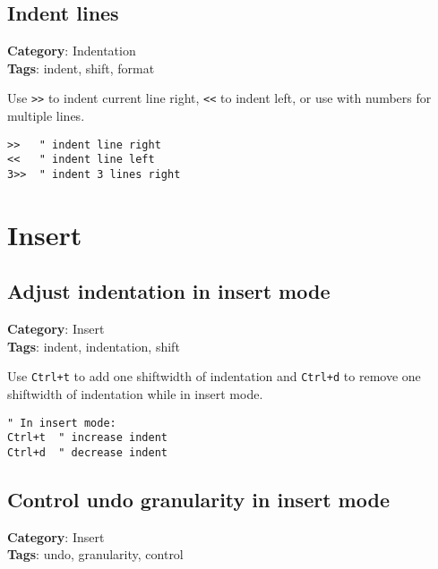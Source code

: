 {{{{{{\section{Indent lines}

\textbf{Category}: Indentation\\ \textbf{Tags}: indent, shift, format
\vspace{0.5cm}

Use {\footnotesize \Verb§>>§} to indent current line right, {\footnotesize \Verb§<<§} to indent left, or use with numbers for multiple lines.

\begin{Exa*}{}
\begin{Verbatim}[fontsize=\footnotesize, breaklines, breakanywhere]
>>   " indent line right
<<   " indent line left
3>>  " indent 3 lines right
\end{Verbatim}
\end{Exa*}

\chapter{Insert}
\section{Adjust indentation in insert mode}

\textbf{Category}: Insert\\ \textbf{Tags}: indent, indentation, shift
\vspace{0.5cm}

Use {\footnotesize \Verb§Ctrl+t§} to add one shiftwidth of indentation and {\footnotesize \Verb§Ctrl+d§} to remove one shiftwidth of indentation while in insert mode.

\begin{Exa*}{}
\begin{Verbatim}[fontsize=\footnotesize, breaklines, breakanywhere]
" In insert mode:
Ctrl+t  " increase indent
Ctrl+d  " decrease indent
\end{Verbatim}
\end{Exa*}

\section{Control undo granularity in insert mode}

\textbf{Category}: Insert\\ \textbf{Tags}: undo, granularity, control
\vspace{0.5cm}

}}}}}}
